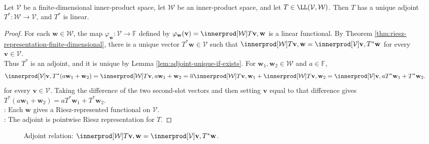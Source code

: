 \begin{theorem} \label{thm:finite-dimensional-adjoint-exists} \\
Let $\mathcal{V}$ be a finite-dimensional inner-product space, let $\mathcal{W}$ be an inner-product space, and let $T\in\LL(\mathcal{V},\mathcal{W})$. Then $T$ has a unique adjoint $T^*:\mathcal{W}\to\mathcal{V}$, and $T^*$ is linear.
\begin{proof}
For each $\mathbf{w}\in\mathcal{W}$, the map $\varphi_{\mathbf{w}}:\mathcal{V}\to\mathbb{F}$ defined by $\varphi_{\mathbf{w}}(\mathbf{v})=\innerprod[\mathcal{W}]{T\mathbf{v},\mathbf{w}}$ is a linear functional. By Theorem \ref{thm:riesz-representation-finite-dimensional}, there is a unique vector $T^*\mathbf{w}\in\mathcal{V}$ such that $\innerprod[\mathcal{W}]{T\mathbf{v},\mathbf{w}} =\innerprod[\mathcal{V}]{\mathbf{v},T^*\mathbf{w}}$ for every $\mathbf{v}\in\mathcal{V}$.\\
Thus $T^*$ is an adjoint, and it is unique by Lemma \ref{lem:adjoint-unique-if-exists}. For $\mathbf{w}_1,\mathbf{w}_2\in\mathcal{W}$ and $a\in\mathbb{F}$,
\begin{align}
\innerprod[\mathcal{V}]{\mathbf{v},T^*(a\mathbf{w}_1+\mathbf{w}_2)}
=\innerprod[\mathcal{W}]{T\mathbf{v},a\mathbf{w}_1+\mathbf{w}_2}
=\overline{a}\innerprod[\mathcal{W}]{T\mathbf{v},\mathbf{w}_1}+\innerprod[\mathcal{W}]{T\mathbf{v},\mathbf{w}_2}
=\innerprod[\mathcal{V}]{\mathbf{v},aT^*\mathbf{w}_1+T^*\mathbf{w}_2}. \nonumber
\end{align}
for every $\mathbf{v}\in\mathcal{V}$. Taking the difference of the two second-slot vectors and then setting $\mathbf{v}$ equal to that difference gives $T^*(a\mathbf{w}_1+\mathbf{w}_2)=aT^*\mathbf{w}_1+T^*\mathbf{w}_2$.\\
: Each $\mathbf{w}$ gives a Riesz-represented functional on $\mathcal{V}$.\\
: The adjoint is pointwise Riesz representation for $T$.
\end{proof}
\end{theorem}

\begin{figure}[H]
  \centering
  
  \caption{Adjoint relation: $\innerprod[\mathcal{W}]{T\mathbf{v},\mathbf{w}}=\innerprod[\mathcal{V}]{\mathbf{v},T^*\mathbf{w}}$.}
  \label{fig:adjoint-inner-product-bridge}
\end{figure}

